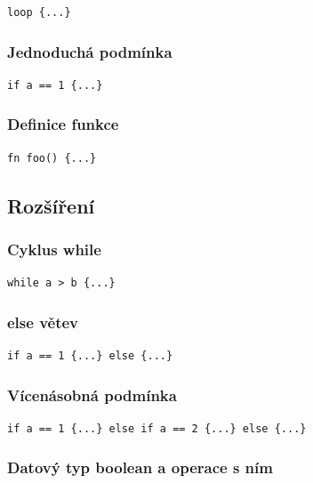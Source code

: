 \documentclass[12pt,a4paper]{article}
\begin{document}
\begin{verbatim}
loop {...}
\end{verbatim}

\subsubsection*{Jednoduchá podmínka}

\begin{verbatim}
if a == 1 {...}
\end{verbatim}

\subsubsection*{Definice funkce}

\begin{verbatim}
fn foo() {...}
\end{verbatim}

\subsection{Rozšíření}

\subsubsection*{Cyklus while}

\begin{verbatim}
while a > b {...}
\end{verbatim}

\subsubsection*{else větev}

\begin{verbatim}
if a == 1 {...} else {...}
\end{verbatim}

\subsubsection*{Vícenásobná podmínka}

\begin{verbatim}
if a == 1 {...} else if a == 2 {...} else {...}
\end{verbatim}

\subsubsection*{Datový typ boolean a operace s ním}
\end{document}
